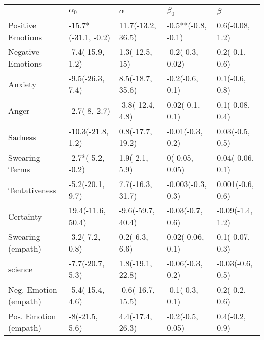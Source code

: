 \begin{tabular}{lllll}
\toprule
{} &           $\alpha_0$ &           $\alpha$ &           $\beta_0$ &           $\beta$ \\
\midrule
Positive Emotions     &  -15.7*(-31.1, -0.2) &  11.7(-13.2, 36.5) &  -0.5**(-0.8, -0.1) &   0.6(-0.08, 1.2) \\
Negative Emotions     &     -7.4(-15.9, 1.2) &     1.3(-12.5, 15) &    -0.2(-0.3, 0.02) &    0.2(-0.1, 0.6) \\
Anxiety               &     -9.5(-26.3, 7.4) &   8.5(-18.7, 35.6) &     -0.2(-0.6, 0.1) &    0.1(-0.6, 0.8) \\
Anger                 &        -2.7(-8, 2.7) &   -3.8(-12.4, 4.8) &     0.02(-0.1, 0.1) &   0.1(-0.08, 0.4) \\
Sadness               &    -10.3(-21.8, 1.2) &   0.8(-17.7, 19.2) &    -0.01(-0.3, 0.2) &   0.03(-0.5, 0.5) \\
Swearing Terms        &    -2.7*(-5.2, -0.2) &     1.9(-2.1, 5.9) &      0(-0.05, 0.05) &  0.04(-0.06, 0.1) \\
Tentativeness         &     -5.2(-20.1, 9.7) &   7.7(-16.3, 31.7) &   -0.003(-0.3, 0.3) &  0.001(-0.6, 0.6) \\
Certainty             &    19.4(-11.6, 50.4) &  -9.6(-59.7, 40.4) &    -0.03(-0.7, 0.6) &  -0.09(-1.4, 1.2) \\
Swearing (empath)     &      -3.2(-7.2, 0.8) &     0.2(-6.3, 6.6) &    0.02(-0.06, 0.1) &   0.1(-0.07, 0.3) \\
science               &     -7.7(-20.7, 5.3) &   1.8(-19.1, 22.8) &    -0.06(-0.3, 0.2) &  -0.03(-0.6, 0.5) \\
Neg. Emotion (empath) &     -5.4(-15.4, 4.6) &  -0.6(-16.7, 15.5) &     -0.1(-0.3, 0.1) &    0.2(-0.2, 0.6) \\
Pos. Emotion (empath) &       -8(-21.5, 5.6) &   4.4(-17.4, 26.3) &    -0.2(-0.5, 0.05) &    0.4(-0.2, 0.9) \\
\bottomrule
\end{tabular}
